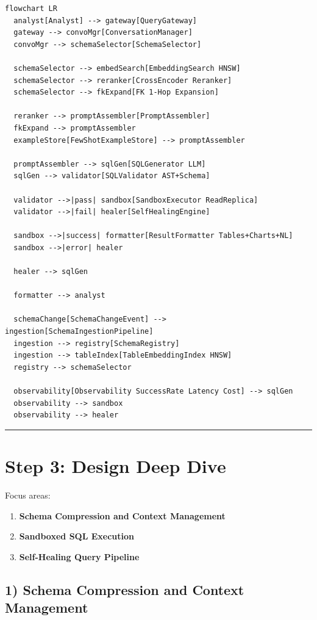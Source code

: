 \begin{verbatim}
flowchart LR
  analyst[Analyst] --> gateway[QueryGateway]
  gateway --> convoMgr[ConversationManager]
  convoMgr --> schemaSelector[SchemaSelector]

  schemaSelector --> embedSearch[EmbeddingSearch HNSW]
  schemaSelector --> reranker[CrossEncoder Reranker]
  schemaSelector --> fkExpand[FK 1-Hop Expansion]

  reranker --> promptAssembler[PromptAssembler]
  fkExpand --> promptAssembler
  exampleStore[FewShotExampleStore] --> promptAssembler

  promptAssembler --> sqlGen[SQLGenerator LLM]
  sqlGen --> validator[SQLValidator AST+Schema]

  validator -->|pass| sandbox[SandboxExecutor ReadReplica]
  validator -->|fail| healer[SelfHealingEngine]

  sandbox -->|success| formatter[ResultFormatter Tables+Charts+NL]
  sandbox -->|error| healer

  healer --> sqlGen

  formatter --> analyst

  schemaChange[SchemaChangeEvent] --> ingestion[SchemaIngestionPipeline]
  ingestion --> registry[SchemaRegistry]
  ingestion --> tableIndex[TableEmbeddingIndex HNSW]
  registry --> schemaSelector

  observability[Observability SuccessRate Latency Cost] --> sqlGen
  observability --> sandbox
  observability --> healer
\end{verbatim}

\bigskip\hrule\bigskip

\section*{Step 3: Design Deep Dive}

Focus areas:

\begin{enumerate}
  \item \textbf{Schema Compression and Context Management}
  \item \textbf{Sandboxed SQL Execution}
  \item \textbf{Self-Healing Query Pipeline}
\end{enumerate}

\subsection*{1) Schema Compression and Context Management}

